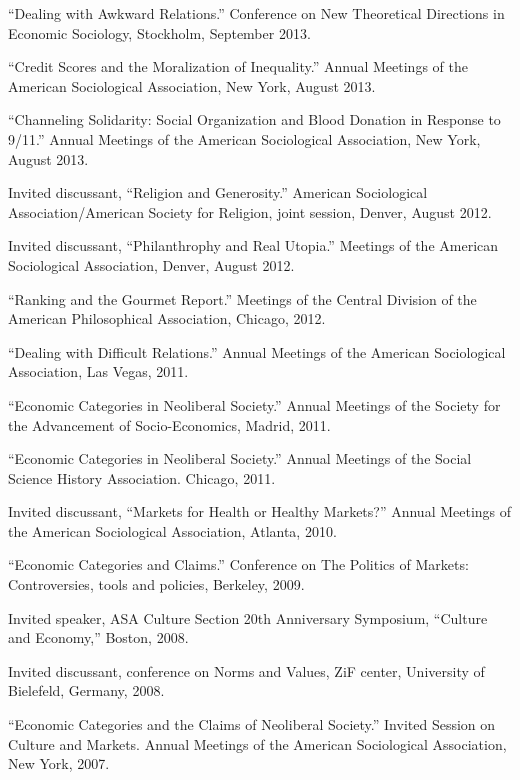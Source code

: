 \documentclass[11pt,article,oneside]{memoir}
\begin{document}


\medskip

\ind ``Dealing with Awkward Relations.'' Conference on New Theoretical Directions in Economic Sociology, Stockholm, September 2013. 

\ind ``Credit Scores and the Moralization of Inequality.'' Annual Meetings of the American Sociological Association, New York, August 2013.
 
\ind ``Channeling Solidarity: Social Organization and Blood Donation in Response to 9/11.'' Annual Meetings of the American Sociological Association, New York, August 2013.

\ind Invited discussant, ``Religion and Generosity.'' American Sociological Association/American Society for Religion, joint session, Denver, August 2012.

\ind Invited discussant, ``Philanthrophy and Real Utopia.'' Meetings of the American Sociological Association, Denver, August 2012. 

\ind ``Ranking and the Gourmet Report.'' Meetings of the Central Division of the American Philosophical Association, Chicago, 2012. 

\ind ``Dealing with Difficult Relations.'' Annual Meetings of the American Sociological Association, Las Vegas, 2011.

\ind ``Economic Categories in Neoliberal Society.'' Annual Meetings of the Society for the Advancement of Socio-Economics, Madrid, 2011.

\ind ``Economic Categories in Neoliberal Society.'' Annual Meetings of the Social Science History Association. Chicago, 2011. 

\ind Invited discussant, ``Markets for Health or Healthy Markets?'' Annual Meetings of the American Sociological Association, Atlanta, 2010. 

\ind ``Economic Categories and Claims.'' Conference on The Politics of Markets: Controversies, tools and policies, Berkeley, 2009.

\ind Invited speaker, ASA Culture Section 20th Anniversary Symposium, ``Culture and Economy,'' Boston, 2008.

\ind Invited discussant, conference on Norms and Values, ZiF center, University of Bielefeld, Germany, 2008. 

\ind ``Economic Categories and the Claims of Neoliberal Society.'' Invited Session on Culture and Markets. Annual Meetings of the American Sociological Association, New York, 2007.
\end{document}
